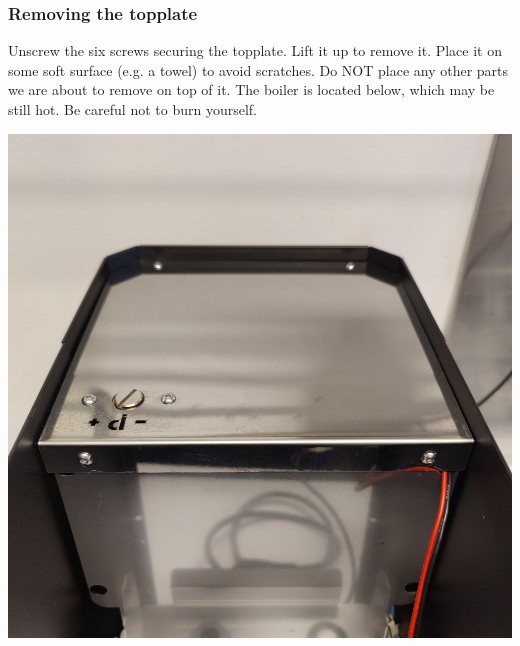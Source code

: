 \documentclass[]{article}
\begin{document}
\subsubsection{Removing the topplate}
\label{sec:topplate}
\begin{minipage}[t]{0.5\linewidth}
	\vspace{0pt}
	Unscrew the six screws securing the topplate. Lift it up to remove it. Place it on some soft surface (e.g. a towel) to avoid scratches. Do NOT place any other parts we are about to remove on top of it. The boiler is located below, which may be still hot. Be careful not to burn yourself.
\end{minipage}
\hfill
\begin{minipage}[t]{0.4\linewidth}
	\vspace{0pt}
	\includegraphics[width=\linewidth]{images/03_installation/05_remove_top.jpg}
\end{minipage}
\end{document}
